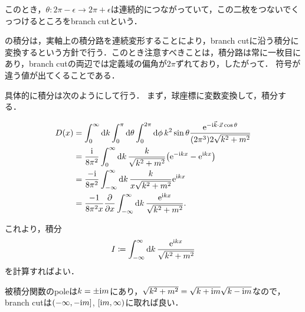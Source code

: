 \begin{itemize}
		このとき，$\theta\colon2\pi-\epsilon\to2\pi+\epsilon$は連続的につながっていて，この二枚をつないでくっつけるところをbranch cutという．

		の積分は，実軸上の積分路を連続変形することにより，branch cutに沿う積分に変換するという方針で行う．このとき注意すべきことは，積分路は常に一枚目にあり，branch cutの両辺では定義域の偏角が$2\pi$ずれており，したがって．
		符号が違う値が出てくることである．

		具体的に積分は次のようにして行う．
		まず，球座標に変数変換して，積分する．
	
		\begin{align}
				D(x) &= \int_{0}^{\infty}\dd{k}\int_{0}^{\pi}\dd{\theta}\int_{0}^{2\pi}\dd{\phi}k^2\sin\theta\frac{\mathrm{e}^{-\mathrm{i}\vec{k}\cdot\vec{x}\cos\theta}}{(2\pi^3)2\sqrt{k^2+m^2}}\\
					 &= \frac{\mathrm{i}}{8\pi^2}\int_{0}^{\infty}\dd{k}\frac{k}{\sqrt{k^2+m^2}}\qty(\mathrm{e}^{-\mathrm{i} kx}-\mathrm{e}^{\mathrm{i} kx})\\
					 &= \frac{-\mathrm{i}}{8\pi^2}\int_{-\infty}^{\infty}\dd{k}\frac{k}{x\sqrt{k^2+m^2}}\mathrm{e}^{\mathrm{i} kx}\\
					 &= \frac{-1}{8\pi^2x}\pdv{}{x}\int_{-\infty}^{\infty}\dd{k}\frac{\mathrm{e}^{\mathrm{i} kx}}{\sqrt{k^2+m^2}}.
		\end{align}
	
		これより，積分
		\begin{equation}
				I \coloneqq \int_{-\infty}^{\infty}\dd{k}\frac{\mathrm{e}^{\mathrm{i} kx}}{\sqrt{k^2+m^2}} 
		\end{equation}
		を計算すればよい．
	
		被積分関数のpoleは$k=\pm \mathrm{i} m $にあり，$\sqrt{k^2+m^2} = \sqrt{k+\mathrm{i} m}\sqrt{k- \mathrm{i} m} $なので，branch cutは$(-\infty, -\mathrm{i} m] $, $[\mathrm{i} m, \infty) $に取れば良い．
		

\end{itemize}
